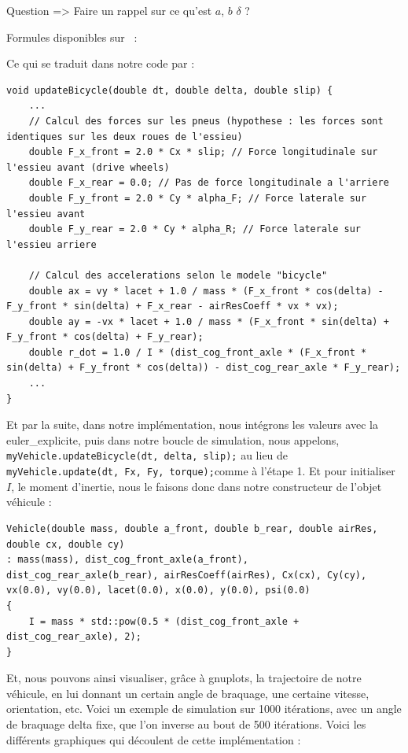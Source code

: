 {\Large Question => Faire un rappel sur ce qu'est $a$, $b$ $\delta$ ?}
\begin{center}
Formules disponibles sur ~\cite{VDS_MathWorks}:
\end{center}


Ce qui se traduit dans notre code par :

\begin{lstlisting}[style=CStyle,label={lst:update_bicycle}]
void updateBicycle(double dt, double delta, double slip) {
    ...
    // Calcul des forces sur les pneus (hypothese : les forces sont identiques sur les deux roues de l'essieu)
    double F_x_front = 2.0 * Cx * slip; // Force longitudinale sur l'essieu avant (drive wheels)
    double F_x_rear = 0.0; // Pas de force longitudinale a l'arriere
    double F_y_front = 2.0 * Cy * alpha_F; // Force laterale sur l'essieu avant
    double F_y_rear = 2.0 * Cy * alpha_R; // Force laterale sur l'essieu arriere

    // Calcul des accelerations selon le modele "bicycle"
    double ax = vy * lacet + 1.0 / mass * (F_x_front * cos(delta) - F_y_front * sin(delta) + F_x_rear - airResCoeff * vx * vx);
    double ay = -vx * lacet + 1.0 / mass * (F_x_front * sin(delta) + F_y_front * cos(delta) + F_y_rear);
    double r_dot = 1.0 / I * (dist_cog_front_axle * (F_x_front * sin(delta) + F_y_front * cos(delta)) - dist_cog_rear_axle * F_y_rear);
    ...
}
\end{lstlisting}

Et par la suite, dans notre implémentation, nous intégrons les valeurs avec la \gls{euler_explicite}, puis dans notre boucle de simulation, nous appelons, \texttt{myVehicle.updateBicycle(dt, delta, slip);} au lieu de \texttt{myVehicle.update(dt, Fx, Fy, torque);}comme à l'étape 1.
Et pour initialiser $I$, le moment d'inertie, nous le faisons donc dans notre constructeur de l'objet véhicule :

\begin{lstlisting}[style=CStyle,label={lst:constructor_vehicle_1}]
Vehicle(double mass, double a_front, double b_rear, double airRes, double cx, double cy)
: mass(mass), dist_cog_front_axle(a_front), dist_cog_rear_axle(b_rear), airResCoeff(airRes), Cx(cx), Cy(cy), vx(0.0), vy(0.0), lacet(0.0), x(0.0), y(0.0), psi(0.0)
{
    I = mass * std::pow(0.5 * (dist_cog_front_axle + dist_cog_rear_axle), 2);
}
\end{lstlisting}

Et, nous pouvons ainsi visualiser, grâce à \glspl{gnuplot}, la trajectoire de notre véhicule, en lui donnant un certain angle de braquage, une certaine vitesse, orientation, etc.
Voici un exemple de simulation sur 1000 itérations, avec un angle de braquage delta fixe, que l'on inverse au bout de 500 itérations.
Voici les différents graphiques qui découlent de cette implémentation :

